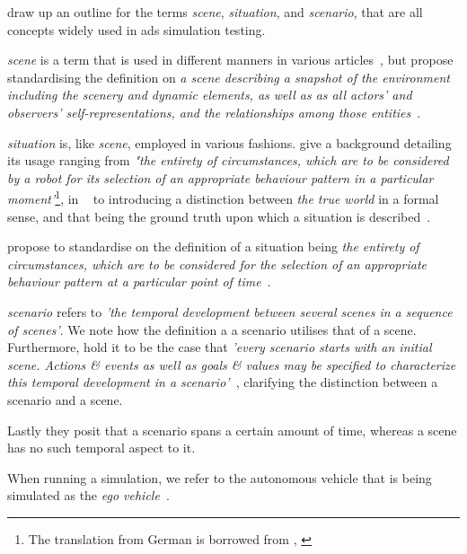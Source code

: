 \citeauthor{scenes} draw up an outline for the terms \textit{scene}, \textit{situation}, and
\textit{scenario}, that are all concepts widely used in \acrshort{ads} simulation testing.

\emph{scene} is a term that is used in different manners in various
articles~\cite[982]{scenes}, but \citeauthor{scenes} propose standardising the definition on
\textit{a scene describing a snapshot of the environment including the scenery and dynamic elements,
    as well as  as all actors’ and observers’ self-representations, and the relationships among those entities}~\cite[983]{scenes}.

\emph{situation} is, like \textit{scene}, employed in various fashions. \citeauthor{scenes}
give a background detailing its usage ranging from \textit{"the entirety of circumstances,
    which are to be considered by a robot for its selection of an appropriate behaviour pattern in a
    particular moment'}\footnote{The translation from German is borrowed from \citeauthor{scenes},
    \cite[984]{scenes}}, in  \citeauthor{scenarioTysk}~\cite[3]{scenarioTysk} to
\citeauthor{schmidtScenario} introducing a distinction between \textit{the true world} in a formal
sense, and that being the ground truth upon which a situation is
described~\cite[892]{schmidtScenario}.

\citeauthor{scenes} propose to standardise on the definition of a situation being \textit{
    the entirety of circumstances, which  are to be considered for the selection of an
    appropriate behaviour pattern at a particular point of time}~\cite[985]{scenes}.

\emph{scenario} refers to \textit{'the temporal development between several scenes in a sequence
    of scenes'}\cite[986]{scenes}. We note how the definition a a scenario utilises that of a scene.
Furthermore, \citeauthor{scenes} hold it to be the case that \textit{'every scenario starts with an
    initial scene. Actions \& events as well as goals \& values may be specified to characterize
    this temporal development in a scenario'}~\cite[986]{scenes}, clarifying the distinction
between a scenario and a scene.

Lastly they posit that a scenario spans a certain amount of time, whereas a scene has no such
temporal aspect to it.


When running a simulation, we refer to the autonomous vehicle that is being
simulated as the \textit{ego vehicle}~\cite{egoDefinition}.


